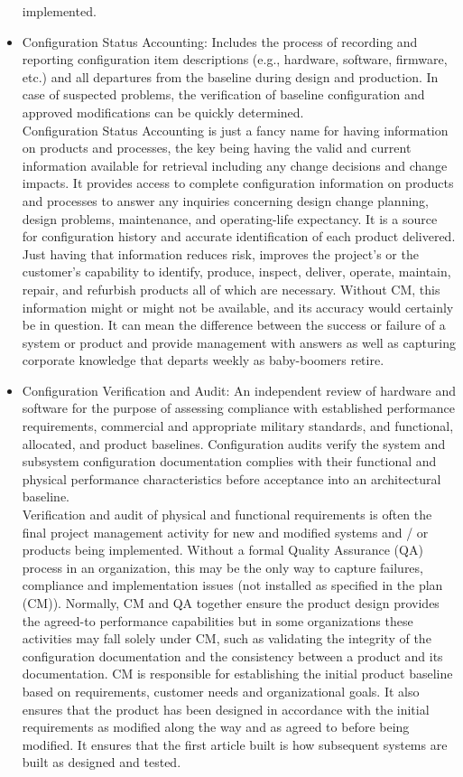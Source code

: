 \begin{itemize}
    implemented.
    \item Configuration Status Accounting:
    Includes the process of recording and reporting configuration item descriptions (e.g., hardware, software, firmware, etc.) and all departures
    from the baseline during design and production. In case of suspected problems, the verification of baseline configuration and approved modifications can be quickly determined. \\
    Configuration Status Accounting is just a fancy name for having information on products
    and processes, the key being having the valid and current information available for
    retrieval including any change decisions and change impacts. It provides access to
    complete configuration information on products and processes to answer any inquiries
    concerning design change planning, design problems, maintenance, and operating-life
    expectancy. It is a source for configuration history and accurate identification of each
    product delivered. Just having that information reduces risk, improves the project’s or
    the customer’s capability to identify, produce, inspect, deliver, operate, maintain, repair,
    and refurbish products all of which are necessary. Without CM, this information might
    or might not be available, and its accuracy would certainly be in question. It can mean
    the difference between the success or failure of a system or product and provide
    management with answers as well as capturing corporate knowledge that departs weekly
    as baby-boomers retire.
    \item Configuration Verification and Audit:
    An independent review of hardware and software for the purpose of assessing compliance with established performance requirements,
    commercial and appropriate military standards, and functional, allocated, and product baselines. Configuration audits verify the system and subsystem configuration documentation
    complies with their functional and physical performance characteristics before acceptance into an architectural baseline. \\
    Verification and audit of physical and functional requirements is often the final project
    management activity for new and modified systems and / or products being implemented.
    Without a formal Quality Assurance (QA) process in an organization, this may be the
    only way to capture failures, compliance and implementation issues (not installed as
    specified in the plan (CM)). Normally, CM and QA together ensure the product design
    provides the agreed-to performance capabilities but in some organizations these activities
    may fall solely under CM, such as validating the integrity of the configuration
    documentation and the consistency between a product and its documentation.
    CM is responsible for establishing the initial
    product baseline based on requirements, customer needs and organizational goals. It also
    ensures that the product has been designed in accordance with the initial requirements as
    modified along the way and as agreed to before being modified. It ensures that the first
    article built is how subsequent systems are built as designed and tested.
\end{itemize}


